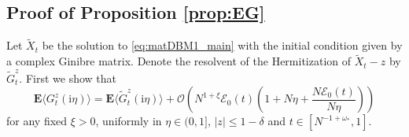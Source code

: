\documentclass[10pt]{amsart}
\numberwithin{equation}{section}
\newcommand{\E}{\mathbf{E}}
\newcommand{\ii}{\mathrm{i}}
\begin{document}
\subsection{Proof of Proposition \ref{prop:EG}}\label{sec:proof_EG} Let $\widetilde{X}_t$ be the solution to \eqref{eq:matDBM1_main} with the initial condition given by a complex Ginibre matrix. Denote the resolvent of the Hermitization of $\widetilde{X}_t-z$ by $\widetilde{G}^z_t$. First we show that
\begin{equation}
\E \langle G_t^z(\ii\eta)\rangle = \E \langle \widetilde{G}^z_t(\ii\eta)\rangle + \mathcal{O}\left(N^{1+\xi}\mathcal{E}_0(t)\left(1+N\eta + \frac{N\mathcal{E}_0(t)}{N\eta} \right)\right)
\label{eq:EG_t}
\end{equation}
for any fixed $\xi>0$, uniformly in $\eta\in (0,1]$, $|z|\le 1-\delta$ and $t\in [N^{-1+\omega_*},1]$.
\end{document}
